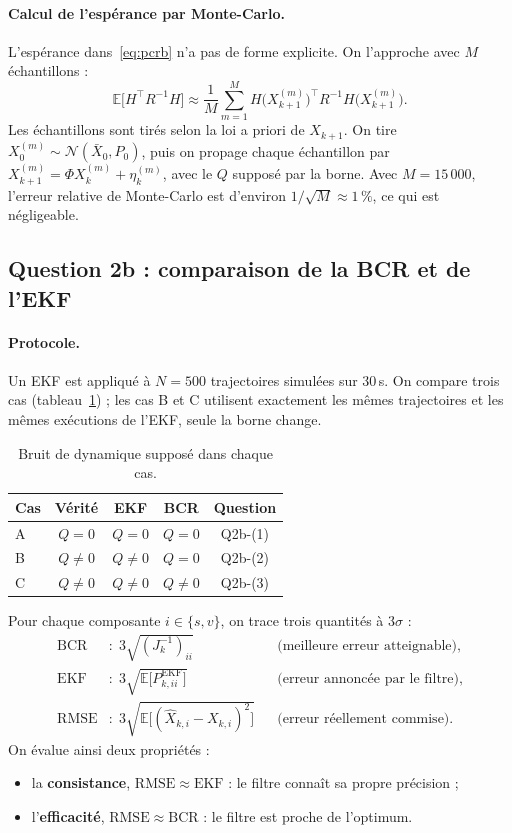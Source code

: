 \documentclass[11pt,a4paper]{article}
\newcommand{\E}{\mathbb{E}}
\newcommand{\N}{\mathcal{N}}
\newcommand{\BCR}{\mathrm{BCR}}
\newcommand{\RMSE}{\mathrm{RMSE}}
\newcommand{\EKF}{\mathrm{EKF}}
\theoremstyle{remark}
\begin{document}
\paragraph{Calcul de l'espérance par Monte-Carlo.}
L'espérance dans~\eqref{eq:pcrb} n'a pas de forme explicite. On l'approche avec $M$ échantillons :
\begin{equation}
\E\big[H^\top R^{-1} H\big] \approx \frac1M \sum_{m=1}^{M} H\big(X_{k+1}^{(m)}\big)^\top R^{-1} H\big(X_{k+1}^{(m)}\big).
\end{equation}
Les échantillons sont tirés selon la loi a priori de $X_{k+1}$. On tire $X_0^{(m)} \sim \N(\bar X_0, P_0)$, puis on propage chaque échantillon par $X_{k+1}^{(m)} = \Phi X_k^{(m)} + \eta_k^{(m)}$, avec le $Q$ supposé par la borne.
Avec $M = 15\,000$, l'erreur relative de Monte-Carlo est d'environ $1/\sqrt{M} \approx 1\,\%$, ce qui est négligeable.


\subsection{Question 2b : comparaison de la BCR et de l'EKF}

\paragraph{Protocole.}
Un EKF est appliqué à $N = 500$ trajectoires simulées sur $30$\,s. On compare trois cas (tableau~\ref{tab:cas}) ; les cas B et C utilisent exactement les mêmes trajectoires et les mêmes exécutions de l'EKF, seule la borne change.

\begin{table}[ht]
\centering
\caption{Bruit de dynamique supposé dans chaque cas.}
\label{tab:cas}
\begin{tabular}{lcccc}
\toprule
Cas & Vérité & EKF & BCR & Question \\
\midrule
A & $Q = 0$ & $Q = 0$ & $Q = 0$ & Q2b-(1) \\
B & $Q \neq 0$ & $Q \neq 0$ & $Q = 0$ & Q2b-(2) \\
C & $Q \neq 0$ & $Q \neq 0$ & $Q \neq 0$ & Q2b-(3) \\
\bottomrule
\end{tabular}
\end{table}

Pour chaque composante $i \in \{s, v\}$, on trace trois quantités à $3\sigma$ :
\begin{align}
\BCR &: \; 3\sqrt{(J_k^{-1})_{ii}} && \text{(meilleure erreur atteignable)}, \\
\EKF &: \; 3\sqrt{\E\big[P^{\EKF}_{k,ii}\big]} && \text{(erreur annoncée par le filtre)}, \\
\RMSE &: \; 3\sqrt{\E\big[(\hat X_{k,i} - X_{k,i})^2\big]} && \text{(erreur réellement commise)}.
\end{align}
On évalue ainsi deux propriétés :
\begin{itemize}[nosep]
  \item la \textbf{consistance}, $\RMSE \approx \EKF$ : le filtre connaît sa propre précision ;
  \item l'\textbf{efficacité}, $\RMSE \approx \BCR$ : le filtre est proche de l'optimum.
\end{itemize}
\end{document}
